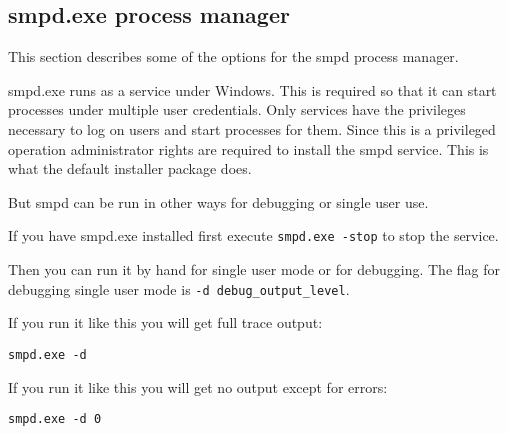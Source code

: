 \documentclass[dvipdfm,11pt]{article}
\begin{document}
\subsection{smpd.exe process manager}
This section describes some of the options for the smpd process manager.

smpd.exe runs as a service under Windows.  This is required so that it can start
processes under multiple user credentials.  Only services have the privileges
necessary to log on users and start processes for them.  Since this is a privileged
operation administrator rights are required to install the smpd service.  This is
what the default installer package does.

But smpd can be run in other ways for debugging or single user use.

If you have smpd.exe installed first execute \texttt{smpd.exe -stop} to stop the
service.

Then you can run it by hand for single user mode or for debugging.  The flag for
debugging single user mode is \texttt{-d debug\_output\_level}.

If you run it like this you will get full trace output:
\begin{verbatim}
smpd.exe -d
\end{verbatim}

If you run it like this you will get no output except for errors:
\begin{verbatim}
smpd.exe -d 0
\end{verbatim}
\end{document}
